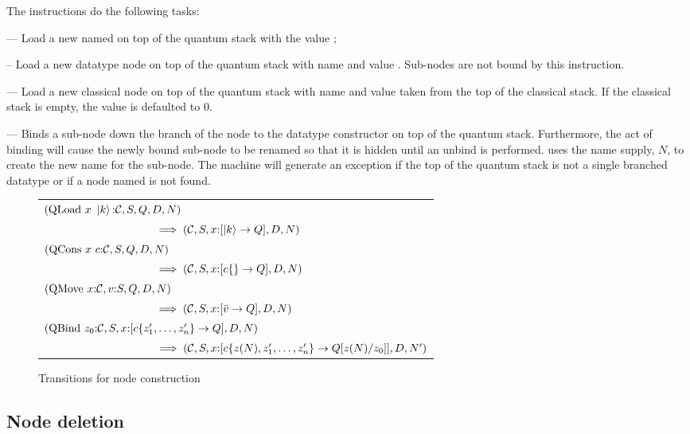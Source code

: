 The instructions do the following tasks:
\begin{description}
\item{} --- Load a new \qbit{} named 
 on top of the quantum stack with the value ;
\item{} -- Load a new datatype node on top of the
quantum stack with name  and value .
Sub-nodes are not bound  by this instruction.
\item{} --- Load a new classical node on top of the
quantum stack with name  and value taken from the
top of the classical stack. If the classical stack is empty, the
value is defaulted to $0$.
\item{} --- Binds a sub-node down the 
branch of the node to the datatype constructor on top of the 
quantum stack. Furthermore, the act of binding will
cause the newly bound sub-node to be renamed so that it is
hidden until an unbind is performed.  
uses the name supply,
$N$, to create the new  name for the sub-node. The machine will
generate an exception if the top of the quantum stack is not a
single branched datatype or if a node named  is not found. 
\end{description}


\begin{figure}[htbp]
\begin{tabular}{l}
$(\mathrm{QLoad}\ x\ \ket{k}{:}\cd,S,Q,D,N)  $ \\
$ \qquad\qquad\qquad\qquad\qquad\implies(\mathcal{C},S,x{:}[\left\vert{k}\right\rangle\to Q],D,N)$ \\
$(\mathrm{QCons}\ x\ c{:}\mathcal{C},S,Q,D,N) $ \\
$ \qquad\qquad\qquad\qquad\qquad\implies (\mathcal{C}, S,x{:}[c\{\}\to Q],D,N) $ \\
$ (\mathrm{QMove}\ x{:}\mathcal{C},v{:}S,Q,D,N) $ \\
$ \qquad\qquad\qquad\qquad\qquad\implies (\mathcal{C},S,x{:}[\bar{v}\to Q],D,N)$ \\
$(\mathrm{QBind}\ z_0{:}\cd,S,x{:}[c\{z_1',\ldots,z_n'\}\to Q],D,N) $\\
$ \qquad\qquad\qquad\qquad\qquad \implies (\mathcal{C},S,x{:}[c\{z(N),z_1',\ldots,z_n'\}\to Q[z(N)/z_0]],D,N') $
\end{tabular}
\caption{Transitions for node construction}\label{fig:trans:nodeconstruction}
\end{figure}



\subsection{Node deletion}\label{subsec:nodedeletion}

